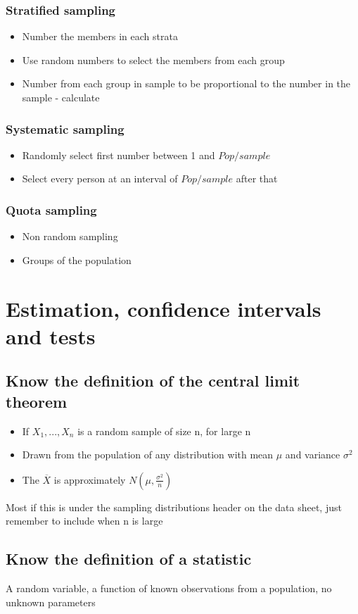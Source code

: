 \documentclass{article}[18pt]
\begin{document}
\subsubsection{Stratified sampling}
\begin{itemize}
\item Number the members in each strata
\item Use random numbers to select the members from each group
\item Number from each group in sample to be proportional to the number in the sample - calculate
\end{itemize}
\subsubsection{Systematic sampling}
\begin{itemize}
\item Randomly select first number between 1 and $Pop/sample$
\item Select every person at an interval of $Pop/sample$ after that
\end{itemize}
\subsubsection{Quota sampling}
\begin{itemize}
\item Non random sampling
\item Groups of the population
\end{itemize}
\section{Estimation, confidence intervals and tests}
\subsection{Know the definition of the central limit theorem}
\begin{itemize}
\item If $X_1,...,X_n$ is a random sample of size n, for large n
\item Drawn from the population of any distribution with mean $\mu$ and variance $\sigma^2$
\item The $\overline{X}$ is approximately $N(\mu,\frac{\sigma^2}{n})$
\end{itemize}
Most if this is under the sampling distributions header on the data sheet, just remember to include when n is large
\subsection{Know the definition of a statistic}
A random variable, a function of known observations from a population, no unknown parameters
\end{document}
